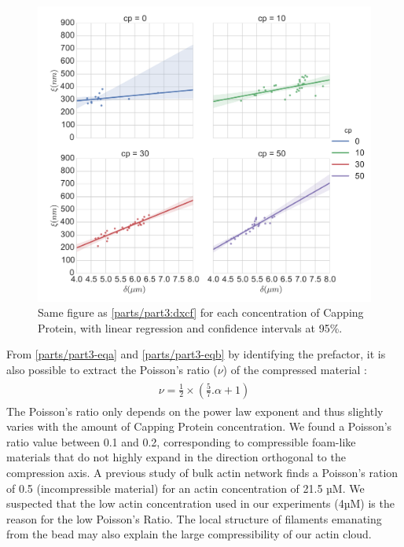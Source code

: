 \documentclass[A4paperpaper,11pt,english]{sphinxmanual}
\begin{document}
\begin{figure}[htbp]
\centering
\capstart

\includegraphics[width=1.000\linewidth]{delta-xi-facets.pdf}
\caption{Same figure as \hyperref[parts/part3:dxcf]{ \ref*{parts/part3:dxcf}} for each concentration of Capping Protein,
with linear regression and confidence intervals at 95\%.}\label{parts/part3:dxf}\end{figure}

From \eqref{parts/part3-eqa} and \eqref{parts/part3-eqb} by identifying the prefactor, it is also possible
to extract the Poisson’s ratio (\(\nu\)) of the compressed material :
\label{parts/part3:equation-nu=f(alpha)}\begin{gather}
\begin{split}\nu =\frac 1 2 \times \left( \frac 5 7.\alpha +1\right)\end{split}\label{parts/part3-nu=f(alpha)}
\end{gather}
The Poisson’s ratio only depends on the power law exponent and thus slightly varies
with the amount of Capping Protein concentration.  We found a Poisson’s ratio value between 0.1 and 0.2, corresponding to compressible
foam-like materials that do not highly expand in the direction orthogonal to
the compression axis. A previous study of bulk actin network finds a Poisson’s
ration of 0.5 (incompressible material) for an actin concentration of 21.5 µM.  We
suspected that the low actin concentration used in our experiments (4µM) is the
reason for the low Poisson’s Ratio. The local structure of filaments
emanating from the  bead may also explain the large compressibility of our actin
cloud.
\end{document}
